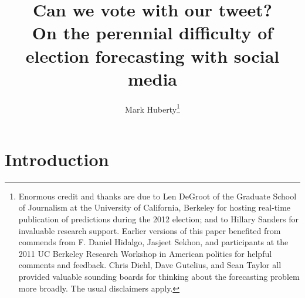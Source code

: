 \documentclass{article}
\begin{document}
\title{Can we vote with our tweet?\\ On the perennial difficulty of election
forecasting with social media}
\author{
Mark Huberty\thanks{Enormous credit and thanks are due to Len DeGroot of the
  Graduate School of Journalism at the University of California,
  Berkeley for hosting real-time publication of predictions during the
2012 election; and to Hillary Sanders for invaluable research
support. Earlier versions of this paper benefited from commends from F. Daniel Hidalgo, Jasjeet Sekhon, and
participants at the 2011 UC Berkeley Research Workshop in American
politics for helpful comments and feedback. Chris Diehl, Dave
Gutelius, and Sean Taylor all provided valuable sounding boards for
thinking about the forecasting problem more broadly. The usual disclaimers apply.}
}

\maketitle
\begin{abstract}

\end{abstract}

\doublespacing
\section{Introduction}
\label{sec:introduction}

\end{document}
